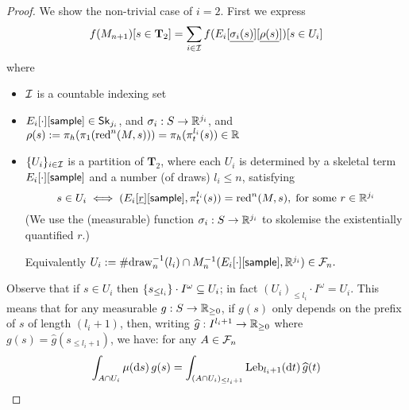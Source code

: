 \begin{proof}
We show the non-trivial case of $i = 2$.
First we express 
\begin{equation}
f(M_{n+1})[s \in \mathbf{T}_2] = \sum_{i \in \mathcal{I}} 
f(E_i[\underline{\sigma_i(s)}][\underline{\rho(s)}])[s \in U_i]
\label{eqn:f 2 n+1}
\end{equation}
where 
\begin{itemize}
\item $\mathcal{I}$ is a countable indexing set
\item $E_i[\cdot][\mathsf{sample}] \in \mathsf{Sk}_{j_i}$, and $\sigma_i : S \to \mathbb{R}^{j_i}$, and $\rho(s) := \pi_h(\pi_1(\operatorname{red}^n(M, s))) = \pi_h(\pi_t^{l_i}(s)) \in \mathbb{R}$ 
\item $\{U_i\}_{i \in \mathcal{I}}$ is a partition of $\mathbf{T}_2$, 
where each $U_i$ is determined by a skeletal term $E_i[\cdot][\mathsf{sample}]$ and a number (of draws) $l_i \leq n$, satisfying
\[
s \in U_i
\iff
(E_i[\underline{r}][{\mathsf{sample}}], \pi_t^{l_i}(s)) = \operatorname{red}^n(M, s),
\;
\hbox{for some }r \in \mathbb{R}^{j_i}
\]
(We use the (measurable) function $\sigma_i : S \to \mathbb{R}^{j_i}$ to skolemise the existentially quantified $r$.)

Equivalently
\(
U_i := \#\mathrm{draw}_n^{-1}(l_i) \cap M_n^{-1}(E_i[\cdot][\mathsf{sample}], \mathbb{R}^{j_i}) \in \mathcal{F}_n.
\)
\end{itemize}

Observe that if $s \in U_i$ then $\{s_{\leq l_i}\} \cdot I^\omega \subseteq U_i$;
in fact $(U_i)_{\leq l_i} \cdot I^\omega = U_i$.
This means that for any measurable $g : S \to \mathbb{R}_{\geq 0}$, if $g(s)$ only depends on the prefix of $s$ of length $(l_i+1)$, then, writing $\widehat{g} : I^{l_i+1} \to \mathbb{R}_{\geq 0}$ where $g(s) = \widehat{g}(s_{\leq l_i+1})$, we have: for any $A \in \mathcal{F}_n$ 
\begin{equation}
\int_{A \cap U_i}  \mu(\mathrm{d} s) \, g(s) = 
\int_{(A \cap U_i)_{\leq l_i+1}} \mathrm{Leb}_{l_i+1}(\mathrm{d} t) \, \widehat{g}(t)
\label{eqn:truncate}
\end{equation}


\end{proof}
